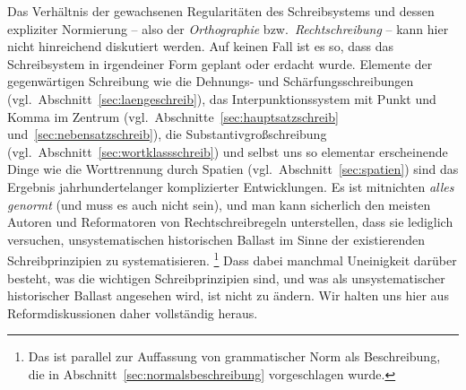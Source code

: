 Das Verhältnis der gewachsenen Regularitäten des Schreibsystems und dessen expliziter Normierung -- also der \textit{Orthographie} bzw.\ \textit{Rechtschreibung} -- kann hier nicht hinreichend diskutiert werden.
Auf keinen Fall ist es so, dass das Schreibsystem in irgendeiner Form geplant oder erdacht wurde.
Elemente der gegenwärtigen Schreibung wie die Dehnungs- und Schärfungsschreibungen (vgl.\ Abschnitt~\ref{sec:laengeschreib}), das Interpunktionssystem mit Punkt und Komma im Zentrum (vgl.\ Abschnitte~\ref{sec:hauptsatzschreib} und~\ref{sec:nebensatzschreib}), die Substantivgroßschreibung (vgl.\ Abschnitt~\ref{sec:wortklassschreib}) und selbst uns so elementar erscheinende Dinge wie die Worttrennung durch Spatien (vgl.\ Abschnitt~\ref{sec:spatien}) sind das Ergebnis jahrhundertelanger komplizierter Entwicklungen.
Es ist mitnichten \textit{alles genormt} (und muss es auch nicht sein), und man kann sicherlich den meisten Autoren und Reformatoren von Rechtschreibregeln unterstellen, dass sie lediglich versuchen, unsystematischen historischen Ballast im Sinne der existierenden Schreibprinzipien zu systematisieren.%
\footnote{Das ist parallel zur Auffassung von grammatischer Norm als Beschreibung, die in Abschnitt~\ref{sec:normalsbeschreibung} vorgeschlagen wurde.}
Dass dabei manchmal Uneinigkeit darüber besteht, was die wichtigen Schreibprinzipien sind, und was als unsystematischer historischer Ballast angesehen wird, ist nicht zu ändern.
Wir halten uns hier aus Reformdiskussionen daher vollständig heraus.

